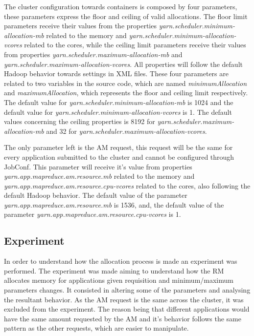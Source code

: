 The cluster configuration towards containers is composed by four parameters, these parameters express the floor and ceiling of valid allocations. The floor limit parameters receive their values from the properties \textit{yarn.scheduler.minimum-allocation-mb} related to the memory and \textit{yarn.scheduler.minimum-allocation-vcores} related to the cores, while the ceiling limit parameters receive their values from properties \textit{yarn.scheduler.maximum-allocation-mb} and \textit{yarn.scheduler.maximum-allocation-vcores}. All properties will follow the default Hadoop behavior towards settings in XML files. These four parameters are related to two variables in the source code, which are named \textit{minimumAllocation} and \textit{maximumAllocation}, which represents the floor and ceiling limit respectively. 
The default value for \textit{yarn.scheduler.minimum-allocation-mb} is 1024 and the default value for  \textit{yarn.scheduler.minimum-allocation-vcores} is 1. The default values concerning the ceiling properties is 8192 for \textit{yarn.scheduler.maximum-allocation-mb} and 32 for \textit{yarn.scheduler.maximum-allocation-vcores}.

The only parameter left is the AM request, this request will be the same for every application submitted to the cluster and cannot be configured through JobConf. This parameter will receive it's value from properties \textit{yarn.app.mapreduce.am.resource.mb} related to the memory and \textit{yarn.app.mapreduce.am.resource.cpu-vcores} related to the cores, also following the default Hadoop behavior. The default value of the parameter \textit{yarn.app.mapreduce.am.resource.mb} is 1536, and, the default value of the parameter \textit{yarn.app.mapreduce.am.resource.cpu-vcores} is 1.

\subsection{Experiment}
In order to understand how the allocation process is made an experiment was performed. The experiment was made aiming to understand how the RM allocates memory for applications given requisition and minimum/maximum parameters changes. It consisted in altering some of the parameters and analysing the resultant behavior. As the AM request is the same across the cluster, it was excluded from the experiment. The reason being that different applications would have the same amount requested by the AM and it's behavior follows the same pattern as the other requests, which are easier to manipulate.

